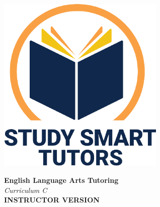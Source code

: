 \documentclass[12pt]{article}
\begin{document}
\newpage




\thispagestyle{empty}

\vspace*{\fill}

\vspace*{3cm}

\begin{center}

    \includegraphics[width=0.6\textwidth]{SST_Color_Logo.png} %
    
    \vspace{2cm} %
    

    
    \Huge \textbf{English Language Arts  Tutoring}\\ [0.3cm]
     \vspace{1.5cm}
    \LARGE \textit{Curriculum C}\\[1cm] 
   

    \Huge \textbf{INSTRUCTOR VERSION}
    
   
    
    \vfill %
    
\end{center}

\newpage








\newpage



\end{document}
